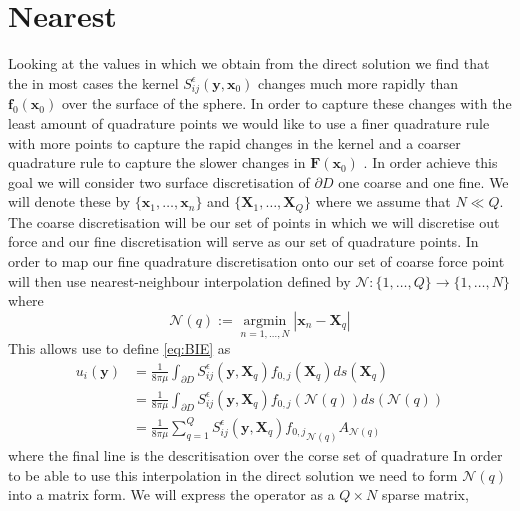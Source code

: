 \section{Nearest}
Looking at the values in which we obtain from the direct solution we find that the in most cases the kernel $S^\epsilon_{ij}(\mathbf{y},\mathbf{x}_0)$ changes much more rapidly than $\mathbf{f}_0(\mathbf{x}_0)$ over the surface of the sphere. In order to capture these changes with the least amount of quadrature points we would like to use a finer quadrature rule with more points to capture the rapid changes in the kernel and a coarser quadrature rule to capture the slower changes in $\mathbf{F}(\mathbf{x}_0)$ \cite{Smith2018AEquation, Gallagher2021}. In order achieve this goal we will consider two surface discretisation of $\partial D$ one coarse and one fine. We will denote these by $\{\mathbf{x}_1, \dots, \mathbf{x}_n\}$ and $\{\mathbf{X}_1, \dots, \mathbf{X}_Q\}$ where we assume that $N \ll Q$. The coarse discretisation will be our set of points in which we will discretise out force and our fine discretisation will serve as our set of quadrature points. In order to map our fine quadrature discretisation onto our set of coarse force point will then use nearest-neighbour interpolation defined by $\mathcal{N}:\{ 1, \dots, Q\} \to \{ 1, \dots, N\}$ where 
\begin{equation}
    \mathcal{N}(q) := \underset{n=1, \ldots, N}{\operatorname{argmin}}|\boldsymbol{x}_n-\boldsymbol{X}_q|
\end{equation}
This allows use to define \cref{eq:BIE} as 
\begin{equation}
\begin{aligned}
\label{eq:BIENearest1}
        u_i(\mathbf{y}) &= \frac{1}{8 \pi \mu} \int_{\partial D} S_{i j}^{\epsilon}\left(\mathbf{y}, \mathbf{X}_q\right) f_{0,j}(\mathbf{X}_q) d s(\mathbf{X}_q) \\
        &= \frac{1}{8 \pi \mu} \int_{\partial D} S_{i j}^{\epsilon}\left(\mathbf{y}, \mathbf{X}_q\right) f_{0,j}(\mathcal{N}(q)) d s(\mathcal{N}(q)) \\
        & = \frac{1}{8 \pi \mu} \sum_{q=1}^Q S_{i j}^{\epsilon}\left(\mathbf{y}, \mathbf{X}_q\right){f_{0,j}}_{\mathcal{N}(q)}A_{\mathcal{N}(q)}
\end{aligned}
\end{equation}
where the final line is the descritisation over the corse set of quadrature In order to be able to use this interpolation in the direct solution we need to form $\mathcal{N}(q)$ into a matrix form. We will express the operator as a $Q \times N$ sparse matrix,
